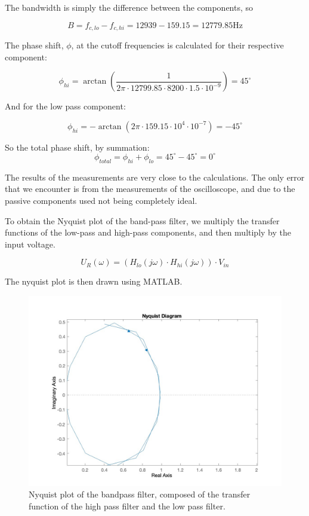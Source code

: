 The bandwidth is simply the difference between the components, so

\begin{equation}
    B = f_{c,lo} - f_{c, hi} = 12939 - 159.15 = 12779.85\text{Hz}
\end{equation}


The phase shift, $\phi$, at the cutoff frequencies is calculated for their respective component:

\begin{equation}
    \phi_{hi}=\arctan\left(\frac{1}{2\pi\cdot12799.85 \cdot 8200 \cdot 1.5 \cdot 10^{-9}}\right) = 45^{\circ}
\end{equation}

And for the low pass component:

\begin{equation}
    \phi_{hi}=-\arctan\left(2\pi \cdot 159.15 \cdot 10^4 \cdot 10^{-7}\right) = -45^{\circ}
\end{equation}

So the total phase shift, by summation:
\begin{equation}
    \phi_{total} = \phi_{hi} + \phi_{lo} = 45^{\circ} - 45^{\circ} = 0^{\circ}
\end{equation}

The results of the measurements are very close to the calculations. The only error that we encounter is from the measurements of the oscilloscope, and due to the passive components used not being completely ideal.


To obtain the Nyquist plot of the band-pass filter, we multiply the transfer functions of the low-pass and high-pass components, and then multiply by the input voltage.

\begin{equation}
    U_R(\omega) = (H_{lo}(j\omega) \cdot H_{hi}(j\omega)) \cdot V_{in}
\end{equation}


The nyquist plot is then drawn using MATLAB.

\begin{figure}[H]
    \centering
    \includegraphics[scale=0.3]{images/nyquist_plot_bandpass.jpg}
    \caption{Nyquist plot of the bandpass filter, composed of the transfer function of the high pass filter and the low pass filter.}
\end{figure}
